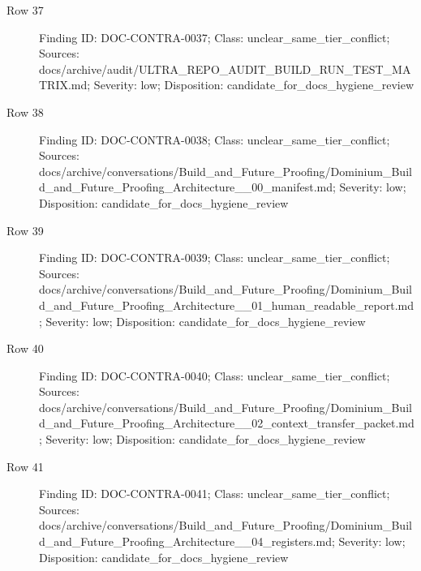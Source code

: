 \documentclass[9pt,a4paper]{book}
\begin{document}
\begin{description}
\item[Row 37] Finding ID: DOC-\allowbreak{}CONTRA-\allowbreak{}0037; Class: unclear\_\allowbreak{}same\_\allowbreak{}tier\_\allowbreak{}conflict; Sources: docs/\allowbreak{}archive/\allowbreak{}audit/\allowbreak{}ULTRA\_\allowbreak{}REPO\_\allowbreak{}AUDIT\_\allowbreak{}BUILD\_\allowbreak{}RUN\_\allowbreak{}TEST\_\allowbreak{}MATRIX.\allowbreak{}md; Severity: low; Disposition: candidate\_\allowbreak{}for\_\allowbreak{}docs\_\allowbreak{}hygiene\_\allowbreak{}review
\item[Row 38] Finding ID: DOC-\allowbreak{}CONTRA-\allowbreak{}0038; Class: unclear\_\allowbreak{}same\_\allowbreak{}tier\_\allowbreak{}conflict; Sources: docs/\allowbreak{}archive/\allowbreak{}conversations/\allowbreak{}Build\_\allowbreak{}and\_\allowbreak{}Future\_\allowbreak{}Proofing/\allowbreak{}Dominium\_\allowbreak{}Build\_\allowbreak{}and\_\allowbreak{}Future\_\allowbreak{}Proofing\_\allowbreak{}Architecture\_\allowbreak{}\_\allowbreak{}00\_\allowbreak{}manifest.\allowbreak{}md; Severity: low; Disposition: candidate\_\allowbreak{}for\_\allowbreak{}docs\_\allowbreak{}hygiene\_\allowbreak{}review
\item[Row 39] Finding ID: DOC-\allowbreak{}CONTRA-\allowbreak{}0039; Class: unclear\_\allowbreak{}same\_\allowbreak{}tier\_\allowbreak{}conflict; Sources: docs/\allowbreak{}archive/\allowbreak{}conversations/\allowbreak{}Build\_\allowbreak{}and\_\allowbreak{}Future\_\allowbreak{}Proofing/\allowbreak{}Dominium\_\allowbreak{}Build\_\allowbreak{}and\_\allowbreak{}Future\_\allowbreak{}Proofing\_\allowbreak{}Architecture\_\allowbreak{}\_\allowbreak{}01\_\allowbreak{}human\_\allowbreak{}readable\_\allowbreak{}report.\allowbreak{}md; Severity: low; Disposition: candidate\_\allowbreak{}for\_\allowbreak{}docs\_\allowbreak{}hygiene\_\allowbreak{}review
\item[Row 40] Finding ID: DOC-\allowbreak{}CONTRA-\allowbreak{}0040; Class: unclear\_\allowbreak{}same\_\allowbreak{}tier\_\allowbreak{}conflict; Sources: docs/\allowbreak{}archive/\allowbreak{}conversations/\allowbreak{}Build\_\allowbreak{}and\_\allowbreak{}Future\_\allowbreak{}Proofing/\allowbreak{}Dominium\_\allowbreak{}Build\_\allowbreak{}and\_\allowbreak{}Future\_\allowbreak{}Proofing\_\allowbreak{}Architecture\_\allowbreak{}\_\allowbreak{}02\_\allowbreak{}context\_\allowbreak{}transfer\_\allowbreak{}packet.\allowbreak{}md; Severity: low; Disposition: candidate\_\allowbreak{}for\_\allowbreak{}docs\_\allowbreak{}hygiene\_\allowbreak{}review
\item[Row 41] Finding ID: DOC-\allowbreak{}CONTRA-\allowbreak{}0041; Class: unclear\_\allowbreak{}same\_\allowbreak{}tier\_\allowbreak{}conflict; Sources: docs/\allowbreak{}archive/\allowbreak{}conversations/\allowbreak{}Build\_\allowbreak{}and\_\allowbreak{}Future\_\allowbreak{}Proofing/\allowbreak{}Dominium\_\allowbreak{}Build\_\allowbreak{}and\_\allowbreak{}Future\_\allowbreak{}Proofing\_\allowbreak{}Architecture\_\allowbreak{}\_\allowbreak{}04\_\allowbreak{}registers.\allowbreak{}md; Severity: low; Disposition: candidate\_\allowbreak{}for\_\allowbreak{}docs\_\allowbreak{}hygiene\_\allowbreak{}review

\end{description}
\end{document}
